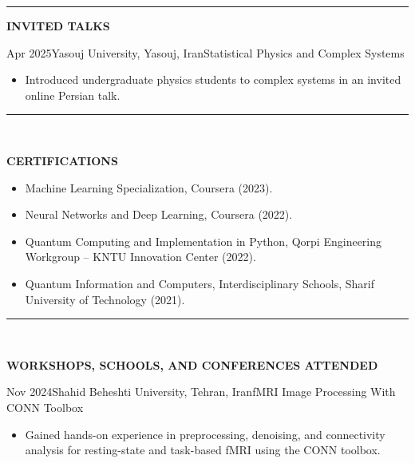 \documentclass[12pt, b4paper]{cv}
\begin{document}
\vspace{-0.15in}
\rule{\textwidth}{1pt}
\vspace{-0.15in}



{\Large \textbf{INVITED TALKS}}
\vspace{0.1in}

\begin{school}{Apr 2025}{Yasouj University, Yasouj, Iran}{Statistical Physics and Complex Systems}
\vspace{-0.1in}
\begin{itemize}
	\item Introduced undergraduate physics students to complex systems in an invited online Persian talk.
\end{itemize}
\end{school}



\vspace{-0.15in}
\rule{\textwidth}{1pt}\\
\vspace{-0.15in}

{\Large \textbf{CERTIFICATIONS}}
\vspace{-5pt}

\begin{itemize}
	\item Machine Learning Specialization, Coursera (2023).
	\item Neural Networks and Deep Learning, Coursera (2022).
	\item Quantum Computing and Implementation in Python, Qorpi Engineering Workgroup – KNTU Innovation Center (2022).
	\item Quantum Information and Computers, Interdisciplinary Schools, Sharif University of Technology (2021).
\end{itemize}


\vspace{-0.15in}
\rule{\textwidth}{1pt}\\
\vspace{-0.15in}

{\Large \textbf{WORKSHOPS, SCHOOLS, AND CONFERENCES ATTENDED}}
\vspace{0.1in}

\begin{school}{Nov 2024}{Shahid Beheshti University, Tehran, Iran}{fMRI Image Processing With CONN Toolbox}
\vspace{-0.1in}
	\begin{itemize}
	    \item Gained hands-on experience in preprocessing, denoising, and connectivity analysis for resting-state and task-based fMRI using the CONN toolbox.
	\end{itemize}
\end{school}
\end{document}
